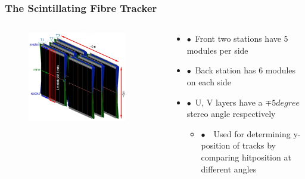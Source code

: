\documentclass[aspectratio=1610, 12pt, xcolor=dvipsnames]{beamer}
\begin{document}
\begin{frame}
\begin{columns}
\begin{column}{0.48\textwidth}
\begin{figure}
      \end{figure}
    \end{column}
  \end{columns}
\end{frame}

\begin{frame}\frametitle{The Scintillating Fibre Tracker}
  \begin{columns}
    \begin{column}[c]{0.48\textwidth}
      \begin{figure}
        \includegraphics[width=0.9\textwidth]{logos/scifi.png}
      \end{figure}
    \end{column}
    \begin{column}{0.48\textwidth}
      \begin{itemize}
        \item $\bullet$\, Front two stations have 5 modules per side
        \item $\bullet$\, Back station has 6 modules on each side
        \item $\bullet$\, U, V layers have a $\mp 5 \si{degree}$ stereo angle respectively
        \begin{itemize}
          \item $\bullet$\, \to\, Used for determining y-position of tracks by comparing hitposition at different angles
        \end{itemize}
      \end{itemize}
    \end{column}
  \end{columns}
\end{frame}
\end{document}

